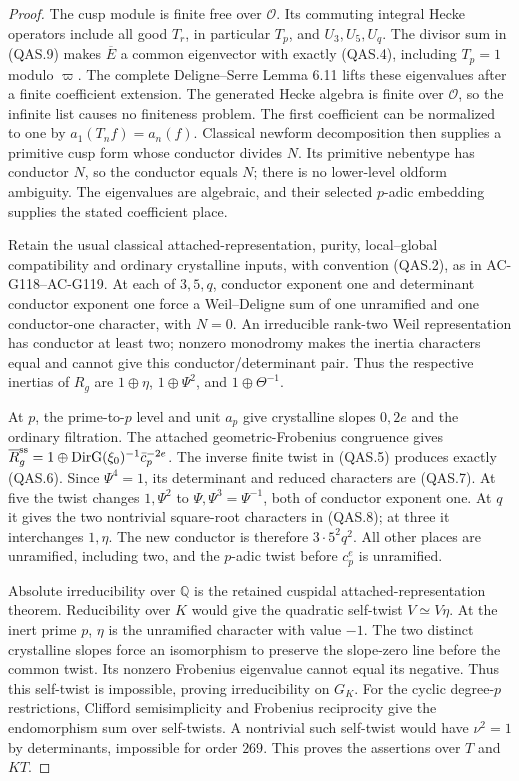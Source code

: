 \begin{proof}
The cusp module is finite free over \(\mathcal O\).
Its commuting integral Hecke operators include all good
\(T_r\), in particular \(T_p\), and \(U_3,U_5,U_q\).
The divisor sum in (QAS.9) makes \(\overline E\) a common
eigenvector with exactly (QAS.4), including \(T_p=1\) modulo
\(\varpi\).  The complete Deligne--Serre Lemma 6.11 lifts
these eigenvalues after a finite coefficient extension.
The generated Hecke algebra is finite over \(\mathcal O\),
so the infinite list causes no finiteness problem.
The first coefficient can be normalized to one by
\(a_1(T_n f)=a_n(f)\).  Classical newform decomposition
then supplies a primitive cusp form whose conductor divides
\(N\).  Its primitive nebentype has conductor \(N\), so the
conductor equals \(N\); there is no lower-level oldform ambiguity.
The eigenvalues are algebraic, and their selected \(p\)-adic
embedding supplies the stated coefficient place.

Retain the usual classical attached-representation, purity,
local--global compatibility and ordinary crystalline inputs,
with convention (QAS.2), as in AC-G118--AC-G119.
At each of \(3,5,q\), conductor exponent one and determinant
conductor exponent one force a Weil--Deligne sum of one
unramified and one conductor-one character, with \(N=0\).
An irreducible rank-two Weil representation has conductor
at least two; nonzero monodromy makes the inertia characters
equal and cannot give this conductor/determinant pair.
Thus the respective inertias of \(R_g\) are
\(1\oplus\eta\), \(1\oplus\Psi^2\), and
\(1\oplus\Theta^{-1}\).

At \(p\), the prime-to-\(p\) level and unit \(a_p\) give
crystalline slopes \(0,2e\) and the ordinary filtration.
The attached geometric-Frobenius congruence gives
\(\overline R_g^{\rm ss}=1\oplus
 \operatorname{DirG}(\xi_0)^{-1}\bar c_p^{-2e}\).
The inverse finite twist in (QAS.5) produces exactly (QAS.6).
Since \(\Psi^4=1\), its determinant and reduced characters
are (QAS.7).  At five the twist changes
\(1,\Psi^2\) to \(\Psi,\Psi^3=\Psi^{-1}\), both of
conductor exponent one.  At \(q\) it gives the two nontrivial
square-root characters in (QAS.8); at three it interchanges
\(1,\eta\).  The new conductor is therefore \(3\cdot5^2q^2\).
All other places are unramified, including two, and the
\(p\)-adic twist before \(c_p^e\) is unramified.

Absolute irreducibility over \(\mathbb Q\) is the retained
cuspidal attached-representation theorem.
Reducibility over \(K\) would give the quadratic self-twist
\(V\simeq V\eta\).  At the inert prime \(p\), \(\eta\)
is the unramified character with value \(-1\).
The two distinct crystalline slopes force an isomorphism to
preserve the slope-zero line before the common twist.
Its nonzero Frobenius eigenvalue cannot equal its negative.
Thus this self-twist is impossible, proving irreducibility on
\(G_K\).  For the cyclic degree-\(p\) restrictions, Clifford
semisimplicity and Frobenius reciprocity give the endomorphism
sum over self-twists.  A nontrivial such self-twist would have
\(\nu^2=1\) by determinants, impossible for order \(269\).
This proves the assertions over \(T\) and \(KT\).


\end{proof}
